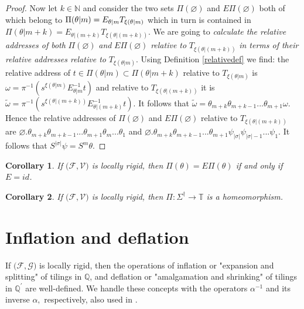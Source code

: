 \documentclass{amsproc}
\theoremstyle{plain}
\newtheorem{corollary}{Corollary}
\theoremstyle{definition}
\numberwithin{equation}{section}
\begin{document}
\begin{proof}
Now let $k\in\mathbb{N}$ and consider the two sets $\Pi(\varnothing)$ and $%
E\Pi(\varnothing)$ both of which belong to $\Pi(\theta|m)=E_{\theta|m}T_{%
\xi(\theta|m)}$ which in turn is contained in $\Pi(\theta|m+k)=E_{\theta
|\left( m+k\right) }T_{\xi(\theta|\left( m+k\right) )}$. We are going to 
\textit{calculate the relative addresses of both} $\Pi(\varnothing)$ \textit{%
and} $E\Pi(\varnothing)$ \textit{relative to} $T_{\xi(\theta|\left(
m+k\right) )}$ \textit{in terms of their relative addresses relative to} $%
T_{\xi(\theta|m)}$. Using Definition \ref{relativedef} we find: the relative
address of $t\in\Pi(\theta|m)\subset\Pi(\theta|m+k)$ relative to $%
T_{\xi(\theta|m)}$ is $\omega=\pi^{-1}(s^{\xi(\theta|m)}E_{\theta|m}^{-1}t)$
and relative to $T_{\xi(\theta|\left( m+k\right) )}$ it is $\widetilde{\omega%
}=\pi^{-1}(s^{\xi(\theta|\left( m+k\right) )}E_{\theta|\left( m+k\right)
}^{-1}t)$. It follows that $\widetilde{\omega }=\theta_{m+k}%
\theta_{m+k-1}...\theta_{m+1}\omega.$ Hence the relative addresses of $%
\Pi(\varnothing)$ and $E\Pi(\varnothing)$ relative to $T_{\xi(\theta|\left(
m+k\right) )}$ are $\varnothing.\theta_{m+k}\theta_{m+k-1}...\theta_{m+1}%
\theta_{m}...\theta_{1}$ and $\varnothing
.\theta_{m+k}\theta_{m+k-1}...\theta_{m+1}\psi_{\left\vert \sigma\right\vert
}\psi_{\left\vert \sigma\right\vert -1}...\psi_{1}$. It follows that $%
S^{\left\vert \sigma\right\vert }\psi=S^{m}\theta$.
\end{proof}

\begin{corollary}
\label{cor01}If $\mathcal{(F},\mathcal{V)}$ is locally rigid, then $\Pi
(\theta)=E\Pi(\theta)$ if and only if $E=id$.
\end{corollary}

\begin{corollary}
\label{cor02}If $\mathcal{(F},\mathcal{V)}$ is locally rigid, then $\Pi
:\Sigma^{\dag}\rightarrow\mathbb{T}$ is a homeomorphism.
\end{corollary}

\section{Inflation and deflation\label{inflation}}

If $(\mathcal{F},\mathcal{G)}$ is locally rigid, then the operations of
inflation or "expansion and splitting" of tilings in $\mathbb{Q}$, and
deflation or "amalgamation and shrinking" of tilings in $\mathbb{Q}^{\prime}$
are well-defined. We handle these concepts with the operators $\alpha^{-1}$
and its inverse $\alpha,$ respectively, also used in \cite{barnsleyvince}.
\end{document}
